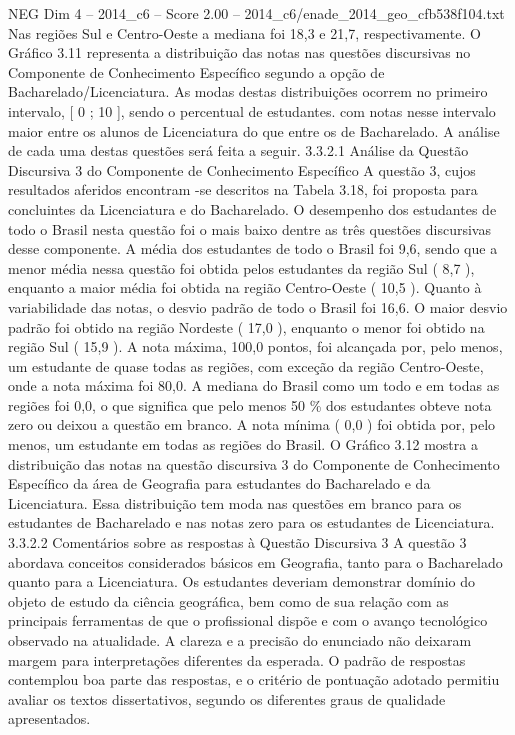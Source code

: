 \begin{textsample}{NEG Dim 4 – 2014\_c6 – Score 2.00 – 2014\_c6/enade\_2014\_geo\_cfb538f104.txt}
Nas regiões Sul e Centro-Oeste a mediana foi 18,3 e 21,7, respectivamente.
O Gráfico 3.11 representa a distribuição das notas nas questões discursivas no Componente de Conhecimento Específico segundo a opção de Bacharelado/Licenciatura.
As modas destas distribuições ocorrem no primeiro intervalo, [ 0 ; 10 ], sendo o percentual de estudantes. com notas nesse intervalo maior entre os alunos de Licenciatura do que entre os de Bacharelado.
A análise de cada uma destas questões será feita a seguir. 3.3.2.1 Análise da Questão Discursiva 3 do Componente de Conhecimento Específico A questão 3, cujos resultados aferidos encontram -se descritos na Tabela 3.18, foi proposta para concluintes da Licenciatura e do Bacharelado.
O desempenho dos estudantes de todo o Brasil nesta questão foi o mais baixo dentre as três questões discursivas desse componente.
A média dos estudantes de todo o Brasil foi 9,6, sendo que a menor média nessa questão foi obtida pelos estudantes da região Sul ( 8,7 ), enquanto a maior média foi obtida na região Centro-Oeste ( 10,5 ).
Quanto à variabilidade das notas, o desvio padrão de todo o Brasil foi 16,6.
O maior desvio padrão foi obtido na região Nordeste ( 17,0 ), enquanto o menor foi obtido na região Sul ( 15,9 ).
A nota máxima, 100,0 pontos, foi alcançada por, pelo menos, um estudante de quase todas as regiões, com exceção da região Centro-Oeste, onde a nota máxima foi 80,0.
A mediana do Brasil como um todo e em todas as regiões foi 0,0, o que significa que pelo menos 50 \% dos estudantes obteve nota zero ou deixou a questão em branco.
A nota mínima ( 0,0 ) foi obtida por, pelo menos, um estudante em todas as regiões do Brasil.
O Gráfico 3.12 mostra a distribuição das notas na questão discursiva 3 do Componente de Conhecimento Específico da área de Geografia para estudantes do Bacharelado e da Licenciatura.
Essa distribuição tem moda nas questões em branco para os estudantes de Bacharelado e nas notas zero para os estudantes de Licenciatura. 3.3.2.2 Comentários sobre as respostas à Questão Discursiva 3 A questão 3 abordava conceitos considerados básicos em Geografia, tanto para o Bacharelado quanto para a Licenciatura.
Os estudantes deveriam demonstrar domínio do objeto de estudo da ciência geográfica, bem como de sua relação com as principais ferramentas de que o profissional dispõe e com o avanço tecnológico observado na atualidade.
A clareza e a precisão do enunciado não deixaram margem para interpretações diferentes da esperada.
O padrão de respostas contemplou boa parte das respostas, e o critério de pontuação adotado permitiu avaliar os textos dissertativos, segundo os diferentes graus de qualidade apresentados.

\end{textsample}
